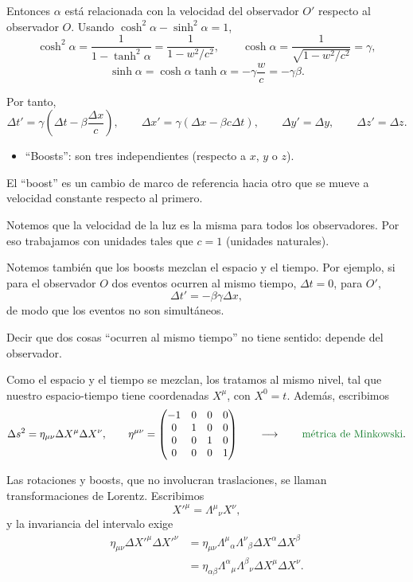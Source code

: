 \documentclass[11pt,a4paper]{article}
\newcommand{\concept}[1]{\textcolor{concept-green}{#1}}
\begin{document}
Entonces $\alpha$ está relacionada con la velocidad del observador $O'$ respecto al observador $O$. Usando $\cosh^2\alpha-\sinh^2\alpha=1$,
\[
  \cosh^2\alpha
  =\frac{1}{1-\tanh^2\alpha}
  =\frac{1}{1-w^2/c^2},
  \qquad
  \cosh\alpha=\frac{1}{\sqrt{1-w^2/c^2}}=\gamma,
\]
\[
  \sinh\alpha=\cosh\alpha\tanh\alpha
  =-\gamma\frac{w}{c}=-\gamma\beta.
\]

Por tanto,
\[
  \Delta t'=\gamma\left(\Delta t-\beta\frac{\Delta x}{c}\right),
  \qquad
  \Delta x'=\gamma(\Delta x-\beta c\Delta t),
  \qquad
  \Delta y'=\Delta y,
  \qquad
  \Delta z'=\Delta z.
\]

\begin{itemize}
  \item ``Boosts'': son tres independientes (respecto a $x$, $y$ o $z$).
\end{itemize}

El ``boost'' es un cambio de marco de referencia hacia otro que se mueve a velocidad constante respecto al primero.

Notemos que la velocidad de la luz es la misma para todos los observadores. Por eso trabajamos con unidades tales que $c=1$ (unidades naturales).

Notemos también que los boosts mezclan el espacio y el tiempo. Por ejemplo, si para el observador $O$ dos eventos ocurren al mismo tiempo, $\Delta t=0$, para $O'$,
\[
  \Delta t'=-\beta\gamma\Delta x,
\]
de modo que los eventos no son simultáneos.

Decir que dos cosas ``ocurren al mismo tiempo'' no tiene sentido: depende del observador.

Como el espacio y el tiempo se mezclan, los tratamos al mismo nivel, tal que nuestro espacio-tiempo tiene coordenadas $X^\mu$, con $X^0=t$. Además, escribimos
\[
  \Delta s^2=\eta_{\mu\nu}\Delta X^\mu\Delta X^\nu,
  \qquad
  \eta^{\mu\nu}=
  \begin{pmatrix}
    -1&0&0&0\\
    0&1&0&0\\
    0&0&1&0\\
    0&0&0&1
  \end{pmatrix}
  \qquad\longrightarrow\qquad
  \concept{\text{métrica de Minkowski}}.
\]

Las rotaciones y boosts, que no involucran traslaciones, se llaman \concept{transformaciones de Lorentz}. Escribimos
\[
  X'^\mu=\Lambda^\mu{}_{\nu}X^\nu,
\]
y la invariancia del intervalo exige
\begin{align*}
  \eta_{\mu\nu}\Delta X'^\mu\Delta X'^\nu
  &=\eta_{\mu\nu}\Lambda^\mu{}_{\alpha}\Lambda^\nu{}_{\beta}
    \Delta X^\alpha\Delta X^\beta \\
  &=\eta_{\alpha\beta}\Lambda^\alpha{}_{\mu}\Lambda^\beta{}_{\nu}
    \Delta X^\mu\Delta X^\nu.
\end{align*}
\end{document}
